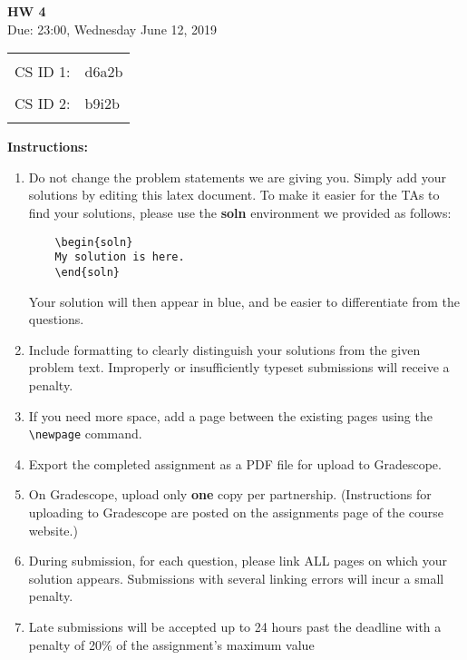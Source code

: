 \documentclass[a4paper, 20pt,fleqn]{article}
\newenvironment{soln}{\color{solnblue}}{}
\begin{document}

\begin{center}
    \LARGE
    \textbf{HW 4}
    \\[1ex]
    \Large Due: 23:00, Wednesday June 12, 2019  \\
\end{center}
    \LARGE
\begin{tabular}{rl}
 & \\
CS ID 1: &  d6a2b\\
 & \\
CS ID 2: & b9i2b\\
 & \\
\end{tabular}
\large

\noindent\textbf{\LARGE Instructions:}
\begin{enumerate}
\item Do not change the problem statements we are giving you. Simply add your solutions by editing this latex document. To make it easier for the TAs to find your solutions, please use the \textbf{soln} environment we provided as follows:
\begin{soln}
\begin{verbatim}
    \begin{soln}
    My solution is here.
    \end{soln}
\end{verbatim}
\end{soln}
Your solution will then appear in blue, and be easier to differentiate from the questions.
\item Include formatting to clearly distinguish your solutions from the given problem text. Improperly or insufficiently typeset submissions will receive a penalty.
\item If you need more space, add a page between the existing pages using the \texttt{\textbackslash newpage} command.
\item Export the completed assignment as a PDF file for upload to Gradescope.
\item On Gradescope, upload only \textbf{one} copy per partnership. (Instructions for uploading to Gradescope are posted on the assignments page of the course website.)
\item During submission, for each question, please link ALL pages on which your solution appears. Submissions with several linking errors will incur a small penalty.
\item Late submissions will be accepted up to 24 hours past the deadline with a penalty of 20\% of the assignment’s maximum value
\end{enumerate}
\end{document}
